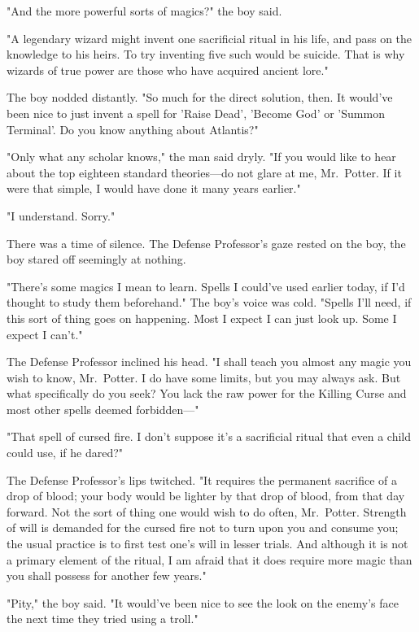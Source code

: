"And the more powerful sorts of magics?" the boy said.

"A legendary wizard might invent one sacrificial ritual in his life, and pass on the knowledge to his heirs. To try inventing five such would be suicide. That is why wizards of true power are those who have acquired ancient lore."

The boy nodded distantly. "So much for the direct solution, then. It would've been nice to just invent a spell for 'Raise Dead', 'Become God' or 'Summon Terminal'. Do you know anything about Atlantis?"

"Only what any scholar knows," the man said dryly. "If you would like to hear about the top eighteen standard theories---do not glare at me, Mr.~Potter. If it were that simple, I would have done it many years earlier."

"I understand. Sorry."

There was a time of silence. The Defense Professor's gaze rested on the boy, the boy stared off seemingly at nothing.

"There's some magics I mean to learn. Spells I could've used earlier today, if I'd thought to study them beforehand." The boy's voice was cold. "Spells I'll need, if this sort of thing goes on happening. Most I expect I can just look up. Some I expect I can't."

The Defense Professor inclined his head. "I shall teach you almost any magic you wish to know, Mr.~Potter. I do have some limits, but you may always ask. But what specifically do you seek? You lack the raw power for the Killing Curse and most other spells deemed forbidden---"

"That spell of cursed fire. I don't suppose it's a sacrificial ritual that even a child could use, if he dared?"

The Defense Professor's lips twitched. "It requires the permanent sacrifice of a drop of blood; your body would be lighter by that drop of blood, from that day forward. Not the sort of thing one would wish to do often, Mr.~Potter. Strength of will is demanded for the cursed fire not to turn upon you and consume you; the usual practice is to first test one's will in lesser trials. And although it is not a primary element of the ritual, I am afraid that it does require more magic than you shall possess for another few years."

"Pity," the boy said. "It would've been nice to see the look on the enemy's face the next time they tried using a troll."

